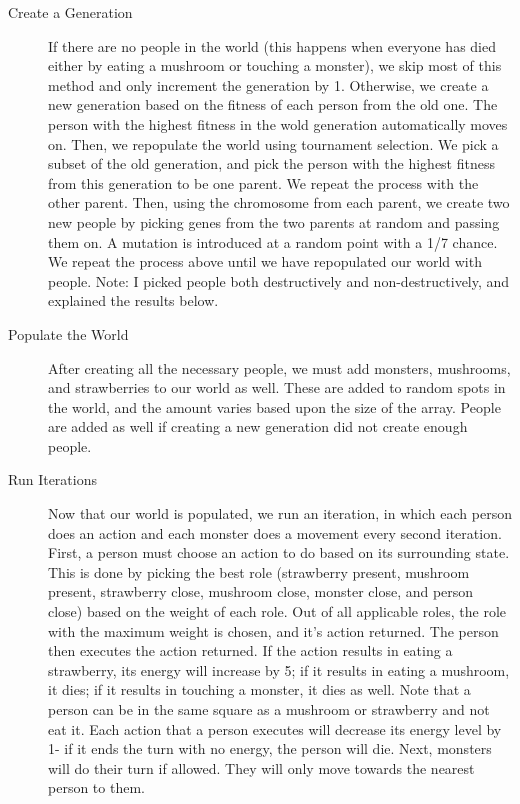 \documentclass{article}
\begin{document}
\begin{description}
\item[Create a Generation]
If there are no people in the world (this happens when everyone has died either by eating a mushroom or touching a monster), we skip most of this method and only increment the generation by 1.  Otherwise, we create a new generation based on the fitness of each person from the old one.  The person with the highest fitness in the wold generation automatically moves on.  Then, we repopulate the world using tournament selection.  We pick a subset of the old generation, and pick the person with the highest fitness from this generation to be one parent.  We repeat the process with the other parent.  Then, using the chromosome from each parent, we create two new people by picking genes from the two parents at random and passing them on.  A mutation is introduced at a random point with a 1/7 chance.  We repeat the process above until we have repopulated our world with people. Note: I picked people both destructively and non-destructively, and explained the results below.
\item[Populate the World]
After creating all the necessary people, we must add monsters, mushrooms, and strawberries to our world as well.  These are added to random spots in the world, and the amount varies based upon the size of the array.  People are added as well if creating a new generation did not create enough people.
\item[Run Iterations]
Now that our world is populated, we run an iteration, in which each person does an action and each monster does a movement every second iteration.  First, a person must choose an action to do based on its surrounding state.  This is done by picking the best role (strawberry present, mushroom present, strawberry close, mushroom close, monster close, and person close) based on the weight of each role.  Out of all applicable roles, the role with the maximum weight is chosen, and it's action returned.  The person then executes the action returned.  If the action results in eating a strawberry, its energy will increase by 5; if it results in eating a mushroom, it dies; if it results in touching a monster, it dies as well.  Note that a person can be in the same square as a mushroom or strawberry and not eat it.  Each action that a person executes will decrease its energy level by 1- if it ends the turn with no energy, the person will die.  Next, monsters will do their turn if allowed.  They will only move towards the nearest person to them.
\end{description}
\end{document}
